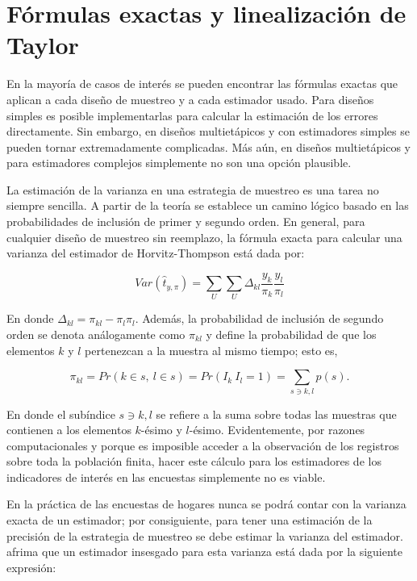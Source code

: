 \documentclass[
  12pt,
  spanish,
]{book}
\begin{document}
\hypertarget{fuxf3rmulas-exactas-y-linealizaciuxf3n-de-taylor}{%
\section{Fórmulas exactas y linealización de Taylor}\label{fuxf3rmulas-exactas-y-linealizaciuxf3n-de-taylor}}

En la mayoría de casos de interés se pueden encontrar las fórmulas exactas que aplican a cada diseño de muestreo y a cada estimador usado. Para diseños simples es posible implementarlas para calcular la estimación de los errores directamente. Sin embargo, en diseños multietápicos y con estimadores simples se pueden tornar extremadamente complicadas. Más aún, en diseños multietápicos y para estimadores complejos simplemente no son una opción plausible.

La estimación de la varianza en una estrategia de muestreo es una tarea no siempre sencilla. A partir de la teoría se establece un camino lógico basado en las probabilidades de inclusión de primer y segundo orden. En general, para cualquier diseño de muestreo sin reemplazo, la fórmula exacta para calcular una varianza del estimador de Horvitz-Thompson está dada por:

\[Var(\hat{t}_{y,\pi}) = \sum_U\sum_U \Delta_{kl}\frac{y_k}{\pi_k}\frac{y_l}{\pi_l}\]

En donde \(\Delta_{kl} = \pi_{kl} - \pi_l \pi_l\). Además, la probabilidad de inclusión de segundo orden se denota análogamente como \(\pi_{kl}\) y define la probabilidad de que los elementos \(k\) y \(l\) pertenezcan a la muestra al mismo tiempo; esto es,

\[
\pi_{kl}=Pr(k\in s, \  l\in s)=Pr(I_k\ I_l=1)=\sum_{s \ni k, l} p(s).
\]

En donde el subíndice \({s \ni k, l}\) se refiere a la suma sobre todas las muestras que contienen a los elementos \(k\)-ésimo y \(l\)-ésimo. Evidentemente, por razones computacionales y porque es imposible acceder a la observación de los registros sobre toda la población finita, hacer este cálculo para los estimadores de los indicadores de interés en las encuestas simplemente no es viable.

En la práctica de las encuestas de hogares nunca se podrá contar con la varianza exacta de un estimador; por consiguiente, para tener una estimación de la precisión de la estrategia de muestreo se debe estimar la varianza del estimador. \citet{Gutierrez_2016} afrima que un estimador insesgado para esta varianza está dada por la siguiente expresión:
\end{document}
